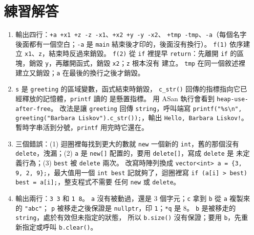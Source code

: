 \section*{練習解答}

\begin{enumerate}
\item 輸出四行：\texttt{+a +x1 +z -z -x1}、\texttt{+x2 +y -y -x2}、
\texttt{+tmp -tmp}、\texttt{-a}（每個名字後面都有一個空白；\texttt{-a} 是
\texttt{main} 結束後才印的，後面沒有換行）。 \texttt{f(1)} 依序建立 \texttt{x1}、\texttt{z}，結束時反過來銷毀。
\texttt{f(2)} 從 \texttt{if} 裡提早 \texttt{return}：先離開 \texttt{if}
的區塊，銷毀 \texttt{y}，再離開函式，銷毀 \texttt{x2}；\texttt{z} 根本沒有
建立。 \texttt{tmp} 在同一個敘述裡建立又銷毀；\texttt{a} 在最後的換行之後才銷毀。
\item \texttt{s} 是 \texttt{greeting} 的區域變數，函式結束時銷毀，
\texttt{c\_str()} 回傳的指標指向它已經釋放的記憶體，\texttt{printf} 讀的
是懸置指標。 用 ASan 執行會看到 \texttt{heap-use-after-free}。 改法是讓
\texttt{greeting} 回傳 \texttt{string}，呼叫端寫
\texttt{printf("\%s\textbackslash n", greeting("Barbara
Liskov").c\_str());}，輸出 \texttt{Hello, Barbara Liskov!}。
暫時字串活到分號，\texttt{printf} 用完時它還在。
\item 三個錯誤：(1) 迴圈裡每找到更大的數就 \texttt{new} 一個新的
\texttt{int}，舊的那個沒有 \texttt{delete}，洩漏；(2) \texttt{a} 是
\texttt{new[]} 配置的，要用 \texttt{delete[]}，寫成 \texttt{delete} 是
未定義行為；(3) \texttt{best} 被 \texttt{delete} 兩次。 改寫時陣列換成
\texttt{vector<int> a = \{3, 9, 2, 9\};}，最大值用一個 \texttt{int best}
記就夠了，迴圈裡寫 \texttt{if (a[i] > best) best = a[i];}，整支程式不需要
任何 \texttt{new} 或 \texttt{delete}。
\item 輸出兩行：\texttt{3 3} 和 \texttt{1 8}。 \texttt{a} 沒有被動過，還是
$3$ 個字元；\texttt{c} 拿到 \texttt{b} 從 \texttt{a} 複製來的 \texttt{"abc"}；
\texttt{p} 被移走之後保證是 \texttt{nullptr}，印 \texttt{1}；\texttt{*q}
是 $8$。 \texttt{b} 是被移走的 \texttt{string}，處於有效但未指定的狀態，
所以 \texttt{b.size()} 沒有保證；要用 \texttt{b}，先重新指定或呼叫
\texttt{b.clear()}。
\end{enumerate}
